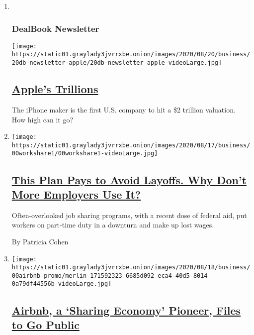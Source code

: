 \begin{enumerate}
\def\labelenumi{\arabic{enumi}.}
\item ~
  \hypertarget{dealbook-newsletter}{%
  \subsubsection{DealBook Newsletter}\label{dealbook-newsletter}}

  \texttt{[image: https://static01.graylady3jvrrxbe.onion/images/2020/08/20/business/20db-newsletter-apple/20db-newsletter-apple-videoLarge.jpg]}

  \hypertarget{apples-trillions}{%
  \subsection{\texorpdfstring{\href{/2020/08/20/business/dealbook/apple-two-trillion-market-value.html}{Apple's
  Trillions}}{Apple's Trillions}}\label{apples-trillions}}

  The iPhone maker is the first U.S. company to hit a \$2 trillion
  valuation. How high can it go?
\item
  \texttt{[image: https://static01.graylady3jvrrxbe.onion/images/2020/08/17/business/00workshare1/00workshare1-videoLarge.jpg]}

  \hypertarget{this-plan-pays-to-avoid-layoffs-why-dont-more-employers-use-it}{%
  \subsection{\texorpdfstring{\href{/2020/08/20/business/economy/jobs-work-sharing-unemployment.html}{This
  Plan Pays to Avoid Layoffs. Why Don't More Employers Use
  It?}}{This Plan Pays to Avoid Layoffs. Why Don't More Employers Use It?}}\label{this-plan-pays-to-avoid-layoffs-why-dont-more-employers-use-it}}

  Often-overlooked job sharing programs, with a recent dose of federal
  aid, put workers on part-time duty in a downturn and make up lost
  wages.

  By Patricia Cohen
\item
  \texttt{[image: https://static01.graylady3jvrrxbe.onion/images/2020/08/18/business/00airbnb-promo/merlin\_171592323\_6685d092-eca4-40d5-8014-0a79df44556b-videoLarge.jpg]}

  \hypertarget{airbnb-a-sharing-economy-pioneer-files-to-go-public}{%
  \subsection{\texorpdfstring{\href{/2020/08/19/technology/airbnb-ipo.html}{Airbnb,
  a `Sharing Economy' Pioneer, Files to Go
  Public}}{Airbnb, a `Sharing Economy' Pioneer, Files to Go Public}}\label{airbnb-a-sharing-economy-pioneer-files-to-go-public}}


\end{enumerate}
